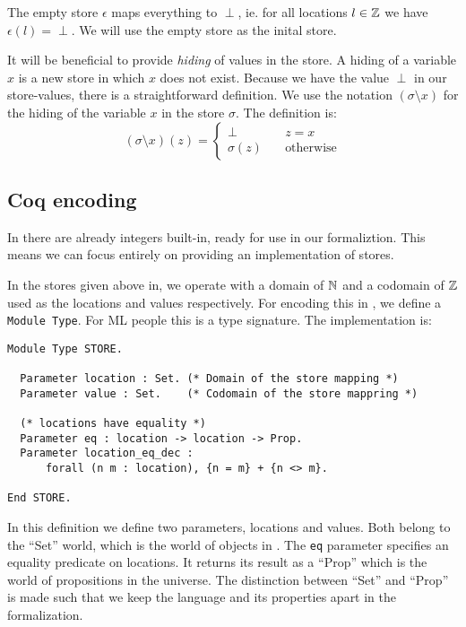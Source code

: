 The empty store $\epsilon$ maps everything to $\perp$, ie. for all
locations $l \in \mathbb{Z}$ we have $\epsilon(l) = \perp$. We will use the
empty store as the inital store.

It will be beneficial to provide \emph{hiding} of values in the store. A
hiding of a variable $x$ is a new store in which $x$ does not
exist. Because we have the value $\perp$ in our store-values, there is
a straightforward definition. We use the notation $(\sigma \setminus x)$
for the hiding of the variable $x$ in the store $\sigma$. The definition
is:
\begin{equation*}
  (\sigma \setminus x)(z) = \begin{cases}
    \perp & \quad z = x\\
    \sigma(z) & \quad \text{otherwise}
  \end{cases}
\end{equation*}

\subsection{Coq encoding}

In \coq{} there are already integers built-in, ready for use in our
formaliztion. This means we can focus entirely on providing an
implementation of stores.

In the stores given above in, we operate with a domain of $\mathbb{N}$ and a
codomain of $\mathbb{Z}$ used as the locations and values respectively. For
encoding this in \coq{}, we define a \texttt{Module Type}. For ML
people this is a type signature. The implementation is:
\begin{verbatim}
Module Type STORE.

  Parameter location : Set. (* Domain of the store mapping *)
  Parameter value : Set.    (* Codomain of the store mappring *)

  (* locations have equality *)
  Parameter eq : location -> location -> Prop.
  Parameter location_eq_dec :
      forall (n m : location), {n = m} + {n <> m}.

End STORE.
\end{verbatim}
In this definition we define two parameters, locations and
values. Both belong to the ``Set'' world, which is the world of
objects in \coq{}. The \texttt{eq} parameter specifies an equality
predicate on locations. It returns its result as a ``Prop'' which is
the world of propositions in the universe. The distinction between
``Set'' and ``Prop'' is made such that we keep the language and its
properties apart in the formalization.

